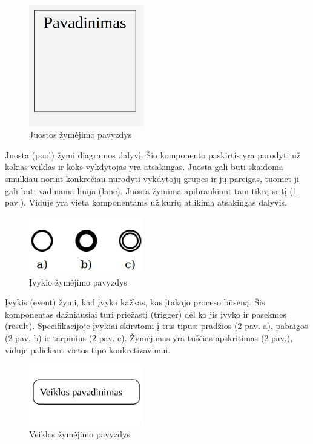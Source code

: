 \documentclass{VUMIFInfBakalaurinis}
\begin{document}
\begin{figure}[H]
	\centering
	\includegraphics[width=5cm]{img/bpm-components/pool}
	\caption{Juostos žymėjimo pavyzdys}
	\label{img:bpm_components_pool}
\end{figure}

Juosta (pool) žymi diagramos dalyvį. Šio komponento paskirtis yra parodyti už kokias veiklas ir koks vykdytojas yra atsakingas. Juosta gali būti skaidoma smulkiau norint konkrečiau nurodyti vykdytojų grupes ir jų pareigas, tuomet ji gali būti vadinama linija (lane). Juosta žymima apibraukiant tam tikrą sritį (\ref{img:bpm_components_pool} pav.). Viduje yra vieta komponentams už kurių atlikimą atsakingas dalyvis.

\begin{figure}[H]
	\centering
	\includegraphics[width=5cm]{img/bpm-components/event_types}
	\caption{Įvykio žymėjimo pavyzdys}
	\label{img:bpm_event_types}
\end{figure}

Įvykis (event) žymi, kad įvyko kažkas, kas įtakojo proceso būseną. Šis komponentas dažniausiai turi priežastį (trigger) dėl ko jis įvyko ir pasekmes (result). Specifikacijoje įvykiai skirstomi į tris tipus: pradžios (\ref{img:bpm_event_types} pav. a), pabaigos (\ref{img:bpm_event_types} pav. b) ir tarpinius (\ref{img:bpm_event_types} pav. c). Žymėjimas yra tuščias apskritimas (\ref{img:bpm_event_types} pav.), viduje paliekant vietos tipo konkretizavimui.

\begin{figure}[H]
	\centering
	\includegraphics[width=5cm]{img/bpm-components/activity}
	\caption{Veiklos žymėjimo pavyzdys}
	\label{img:bpm_components_activity}
\end{figure}
\end{document}
